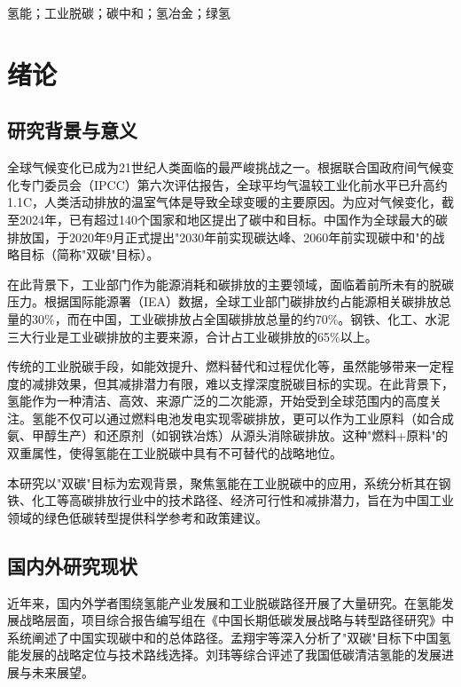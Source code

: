 \documentclass[12pt,a4paper]{ctexart}
\begin{document}
\vspace{12bp}
 氢能；工业脱碳；碳中和；氢冶金；绿氢

\newpage
\tableofcontents
\section{绪论}
\subsection{研究背景与意义}

全球气候变化已成为21世纪人类面临的最严峻挑战之一。根据联合国政府间气候变化专门委员会（IPCC）第六次评估报告，全球平均气温较工业化前水平已升高约1.1\textdegree C，人类活动排放的温室气体是导致全球变暖的主要原因。为应对气候变化，截至2024年，已有超过140个国家和地区提出了碳中和目标。中国作为全球最大的碳排放国，于2020年9月正式提出"2030年前实现碳达峰、2060年前实现碳中和"的战略目标（简称"双碳"目标）。

在此背景下，工业部门作为能源消耗和碳排放的主要领域，面临着前所未有的脱碳压力。根据国际能源署（IEA）数据，全球工业部门碳排放约占能源相关碳排放总量的30\%，而在中国，工业碳排放占全国碳排放总量的约70\%。钢铁、化工、水泥三大行业是工业碳排放的主要来源，合计占工业碳排放的65\%以上。

传统的工业脱碳手段\cite{luo2023}，如能效提升、燃料替代和过程优化等，虽然能够带来一定程度的减排效果，但其减排潜力有限，难以支撑深度脱碳目标的实现。在此背景下，氢能作为一种清洁、高效、来源广泛的二次能源，开始受到全球范围内的高度关注。氢能不仅可以通过燃料电池发电实现零碳排放，更可以作为工业原料（如合成氨、甲醇生产）和还原剂（如钢铁冶炼）从源头消除碳排放。这种"燃料+原料"的双重属性，使得氢能在工业脱碳中具有不可替代的战略地位。

本研究以"双碳"目标为宏观背景，聚焦氢能在工业脱碳中的应用，系统分析其在钢铁、化工等高碳排放行业中的技术路径、经济可行性和减排潜力，旨在为中国工业领域的绿色低碳转型提供科学参考和政策建议。

\subsection{国内外研究现状}

近年来，国内外学者围绕氢能产业发展和工业脱碳路径开展了大量研究。在氢能发展战略层面，项目综合报告编写组在《中国长期低碳发展战略与转型路径研究》中系统阐述了中国实现碳中和的总体路径。孟翔宇等深入分析了"双碳"目标下中国氢能发展的战略定位与技术路线选择。刘玮等综合评述了我国低碳清洁氢能的发展进展与未来展望。
\end{document}
